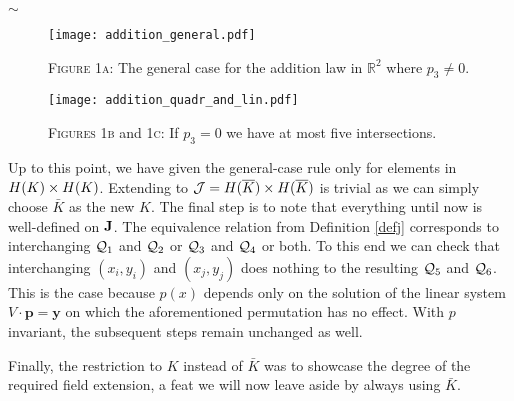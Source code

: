 \documentclass[english,11pt,a4paper]{article}
\begin{document}
\begin{center}
$\sim$
\end{center}


\begin{figure}[ht!]
  \fline
  \begin{center}
    \vspace{1mm}
    \texttt{[image: addition\_general.pdf]}

    {\scshape Figure 1a}: The general case for the addition law in $\mathds{R}^2$ where $p_3 \neq 0$.

    \vspace{1mm}

    \texttt{[image: addition\_quadr\_and\_lin.pdf]}

    {\scshape Figures 1b} and {\scshape 1c}: If $p_3 = 0$ we have at most five intersections.
  \end{center}
  \vspace{-1.5mm}
  \fline
\end{figure}


\begin{remark}
  Up to this point, we have given the general-case rule only for elements in $H(K) \times H(K)$. Extending to $\mathcal{J} = H(\overline K) \times H(\overline K)$ is trivial as we can simply choose $\bar K$ as the new $K$. The final step is to note that everything until now is well-defined on $\mathbf{J}$. The equivalence relation from Definition \ref{defj} corresponds to interchanging $\mathcal{Q}_1$ and $\mathcal{Q}_2$ or $\mathcal{Q}_3$ and $\mathcal{Q}_4$ or both.
  To this end we can check that interchanging $(x_i,y_i)$ and $(x_j,y_j)$ does nothing to the resulting $\mathcal{Q}_5$ and $\mathcal{Q}_6$. This is the case because $p(x)$ depends only on the solution of the linear system $V \cdot \mathbf{p} = \mathbf{y}$ on which the aforementioned permutation has no effect. With $p$ invariant, the subsequent steps remain unchanged as well.

  Finally, the restriction to $K$ instead of $\bar K$ was to showcase the degree of the required field extension, a feat we will now leave aside by always using $\bar K$.
\end{remark}


\end{document}
